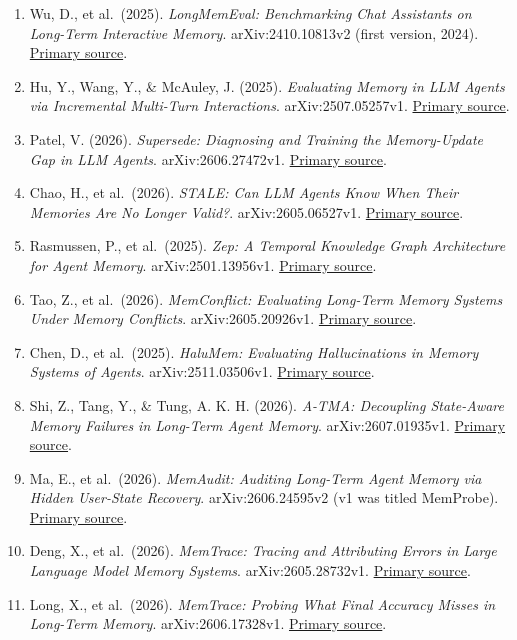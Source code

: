 \documentclass[10pt,a4paper]{article}
\begin{document}
\begin{enumerate}
\item
  Wu, D., et al.~(2025). \emph{LongMemEval: Benchmarking Chat Assistants on Long-Term Interactive Memory}. arXiv:2410.10813v2 (first version, 2024). \href{https://arxiv.org/abs/2410.10813v2}{Primary source}.
\item
  Hu, Y., Wang, Y., \& McAuley, J. (2025). \emph{Evaluating Memory in LLM Agents via Incremental Multi-Turn Interactions}. arXiv:2507.05257v1. \href{https://arxiv.org/abs/2507.05257v1}{Primary source}.
\item
  Patel, V. (2026). \emph{Supersede: Diagnosing and Training the Memory-Update Gap in LLM Agents}. arXiv:2606.27472v1. \href{https://arxiv.org/abs/2606.27472v1}{Primary source}.
\item
  Chao, H., et al.~(2026). \emph{STALE: Can LLM Agents Know When Their Memories Are No Longer Valid?}. arXiv:2605.06527v1. \href{https://arxiv.org/abs/2605.06527v1}{Primary source}.
\item
  Rasmussen, P., et al.~(2025). \emph{Zep: A Temporal Knowledge Graph Architecture for Agent Memory}. arXiv:2501.13956v1. \href{https://arxiv.org/abs/2501.13956v1}{Primary source}.
\item
  Tao, Z., et al.~(2026). \emph{MemConflict: Evaluating Long-Term Memory Systems Under Memory Conflicts}. arXiv:2605.20926v1. \href{https://arxiv.org/abs/2605.20926v1}{Primary source}.
\item
  Chen, D., et al.~(2025). \emph{HaluMem: Evaluating Hallucinations in Memory Systems of Agents}. arXiv:2511.03506v1. \href{https://arxiv.org/abs/2511.03506v1}{Primary source}.
\item
  Shi, Z., Tang, Y., \& Tung, A. K. H. (2026). \emph{A-TMA: Decoupling State-Aware Memory Failures in Long-Term Agent Memory}. arXiv:2607.01935v1. \href{https://arxiv.org/abs/2607.01935v1}{Primary source}.
\item
  Ma, E., et al.~(2026). \emph{MemAudit: Auditing Long-Term Agent Memory via Hidden User-State Recovery}. arXiv:2606.24595v2 (v1 was titled MemProbe). \href{https://arxiv.org/abs/2606.24595v2}{Primary source}.
\item
  Deng, X., et al.~(2026). \emph{MemTrace: Tracing and Attributing Errors in Large Language Model Memory Systems}. arXiv:2605.28732v1. \href{https://arxiv.org/abs/2605.28732v1}{Primary source}.
\item
  Long, X., et al.~(2026). \emph{MemTrace: Probing What Final Accuracy Misses in Long-Term Memory}. arXiv:2606.17328v1. \href{https://arxiv.org/abs/2606.17328v1}{Primary source}.

\end{enumerate}
\end{document}
